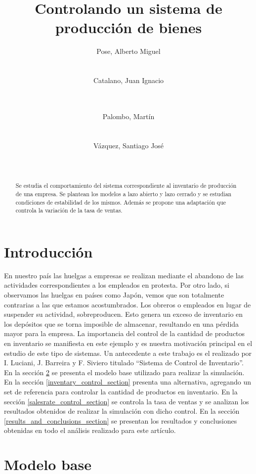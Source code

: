 \documentclass{sig-alternate}
\title{Controlando un sistema de producción de bienes}
\author{
\alignauthor
Pose, Alberto Miguel\\
       \affaddr{Instituto Tecnológico de Buenos Aires}\\
       \affaddr{Buenos Aires, Argentina}\\
       \email{apose@alu.itba.edu.ar}
\alignauthor
Catalano, Juan Ignacio\\
       \affaddr{Instituto Tecnológico de Buenos Aires}\\
       \affaddr{Buenos Aires, Argentina}\\
       \email{jcatalan@alu.itba.edu.ar}
\and
\alignauthor 
Palombo, Martín\\
       \affaddr{Instituto Tecnológico de Buenos Aires}\\
       \affaddr{Buenos Aires, Argentina}\\
       \email{mpalombo@alu.itba.edu.ar}
\alignauthor 
Vázquez, Santiago José\\
       \affaddr{Instituto Tecnológico de Buenos Aires}\\
       \affaddr{Buenos Aires, Argentina}\\
       \email{savazque@alu.itba.edu.ar}
}
\date{}
\begin{document}
\maketitle

\begin{abstract}
Se estudia el comportamiento del sistema correspondiente al inventario de producción de una empresa. Se plantean los modelos a lazo abierto y
lazo cerrado y se estudian condiciones de estabilidad de los mismos. Además se propone una adaptación que controla la variación de la tasa
de ventas.
\end{abstract}

\section{Introducción}
\label{intro_section}
En nuestro país las huelgas a empresas se realizan mediante el abandono de las actividades correspondientes a los empleados en protesta. Por otro
lado, si observamos las huelgas en países como Japón, vemos que son totalmente contrarias a las que estamos acostumbrados. Los obreros o empleados
en lugar de suspender su actividad, sobreproducen. Esto genera un exceso de inventario en los depósitos que se torna imposible de almacenar,
resultando en una pérdida mayor para la empresa. La importancia del control de la cantidad de productos en inventario se manifiesta en este
ejemplo y es nuestra motivación principal en el estudio de este tipo de sistemas. Un antecedente a este trabajo es el realizado por I. Luciani, J. Barreira y
F. Siviero titulado ``Sistema de Control de Inventario''\cite{iluciani}.\\ 
En la sección \ref{model_section} se presenta el modelo base utilizado para realizar la simulación. En la sección \ref{inventary_control_section} presenta una alternativa, 
agregando un set de referencia para controlar la cantidad de productos en inventario. En la sección \ref{salesrate_control_section} se controla
la tasa de ventas y se analizan los resultados obtenidos de realizar la simulación con dicho control. En la sección \ref{results_and_conclusions_section}
se presentan los resultados y conclusiones obtenidas en todo el análisis realizado para este artículo.

\section{Modelo base}
\label{model_section}
\end{document}
